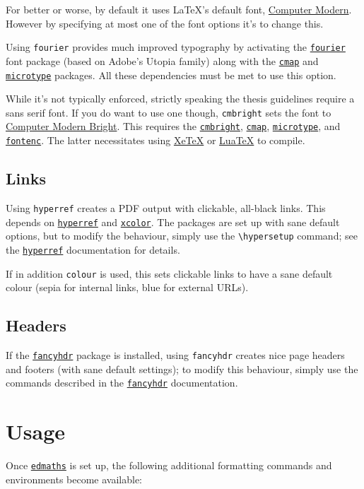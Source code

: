 \documentclass[12pt]{article}
\newcommand\pkg[1]{\href{https://www.ctan.org/pkg/#1}{\color{teal}\lstinline{#1}}}
\newcommand\key[1]{{\color{orange}\lstinline|#1|}}
\begin{document}
For better or worse, by default it uses \LaTeX's default font, \href{https://en.wikipedia.org/wiki/Computer_Modern}{Computer Modern}. However by specifying at most one of the font options it's to change this.

Using \key{fourier} provides much improved typography by activating the \pkg{fourier} font package (based on Adobe's Utopia family) along with the \pkg{cmap} and \pkg{microtype} packages. All these dependencies must be met to use this option.

While it's not typically enforced, strictly speaking the thesis guidelines require a sans serif font. If you do want to use one though, \key{cmbright} sets the font to \href{https://tug.org/FontCatalogue/computermodernbright/}{Computer Modern Bright}. This requires the \pkg{cmbright}, \pkg{cmap}, \pkg{microtype}, and \pkg{fontenc}. The latter necessitates using \href{https://xetex.sourceforge.net/}{XeTeX} or \href{https://www.luatex.org}{LuaTeX} to compile.

\subsection{Links}

Using \key{hyperref} creates a PDF output with clickable, all-black links. This depends on \pkg{hyperref} and \pkg{xcolor}. The packages are set up with sane default options, but to modify the behaviour, simply use the \lstinline|\hypersetup| command; see the \pkg{hyperref} documentation for details.

If in addition \key{colour} is used, this sets clickable links to have a sane default colour (sepia for internal links, blue for external URLs).

\subsection{Headers}

If the \pkg{fancyhdr} package is installed, using \key{fancyhdr} creates nice page headers and footers (with sane default settings); to modify this behaviour, simply use the commands described in the \pkg{fancyhdr} documentation.

\section{Usage}

Once \pkg{edmaths} is set up, the following additional formatting commands and environments become available:
\end{document}

